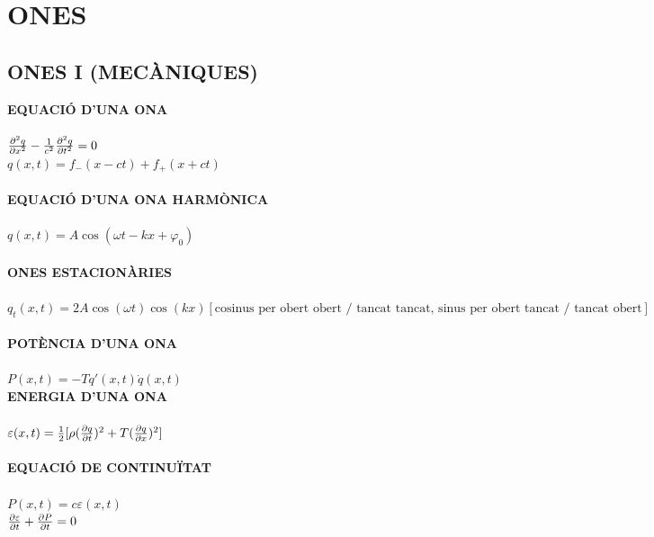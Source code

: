 \documentclass[11pt]{article}
\begin{document}
\section{ONES}

\subsection{ONES I (MECÀNIQUES)}

\begin{tcolorbox}[
  title=Fórmues bàsiques,
  colback=Pink!5!white,
  colframe=Pink!70!black,
  coltitle=white,
  colbacktitle=Pink!70!black,
  fonttitle=\bfseries,
  arc=6pt,
  boxrule=0.8pt
]

\textbf{EQUACIÓ D'UNA ONA}\\ 
\\
$\pdv[2]{q}{x} -\frac{1}{c^2} \pdv[2]{q}{t} = 0$\\
$q(x,t) = f_-(x-ct) + f_+(x+ct)$\\
\\
\textbf{EQUACIÓ D'UNA ONA HARMÒNICA}\\
\\
$q(x,t) = A\cos(\omega t -kx + \varphi_0)$ \\
\\
\textbf{ONES ESTACIONÀRIES}\\
\\
$q_t(x,t) = 2A\cos(\omega t)\cos(kx) [\text{cosinus per obert obert / tancat tancat, sinus per obert tancat / tancat obert}]$ \\
\\
\textbf{POTÈNCIA D'UNA ONA}\\
\\
$P(x,t) = -T q'(x,t) \dot{q}(x,t)$
\\
\textbf{ENERGIA D'UNA ONA}\\
\\
$\varepsilon(x,t) = \frac{1}{2}[\rho (\pdv{q}{t})^2 + T (\pdv{q}{x})^2]$\\
\\
\textbf{EQUACIÓ DE CONTINUÏTAT}\\
\\
$P(x,t) = c\varepsilon(x,t)$\\
$\pdv{\varepsilon}{t} + \pdv{P}{t} = 0$ 


\end{tcolorbox}
\end{document}

